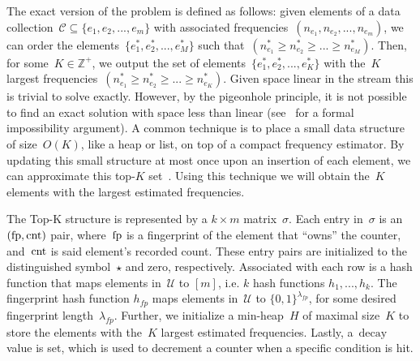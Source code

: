 The exact version of the problem is defined as follows: given elements of a data collection~$\mathcal{C} \subseteq  \{ e_1,e_2,...,e_m \}$ with associated frequencies~$(n_{e_1},n_{e_2},...,n_{e_m})$, we can order the elements~$\{ e^{*}_{1},e^{*}_{2},...,e^{*}_{M} \}$ such that~$(n^{*}_{e_1} \geq n^{*}_{e_2} \geq ... \geq n^{*}_{e_M})$. Then, for some~$K \in \mathbb{Z}^{+}$, we output the set of elements~$\{ e^{*}_{1},e^{*}_{2},...,e^{*}_{K} \}$ with the~$K$ largest frequencies~$(n^{*}_{e_1} \geq n^{*}_{e_2} \geq ... \geq n^{*}_{e_K})$. Given space linear in the stream this is trivial to solve exactly. However, by the pigeonhole principle, it is not possible to find an exact solution with space less than linear (see~\cite{Roughgarden_Valiant} for a formal impossibility argument).
A common technique is to place a small data structure of size~$O(K)$, like a heap or list, on top of a compact frequency estimator. By updating this small structure at most once upon an insertion of each element, we can approximate this top-$K$ set~\cite{mandal2018topkapi,metwally2006}. Using this technique we will obtain the~$K$ elements with the largest estimated frequencies. 

The Top-K structure is represented by a $k{ \times} m$ matrix~$\sigma$. Each entry in~$\sigma$ is an $(\textup{fp},\textup{cnt})$ pair, where~$\textup{fp}$ is a fingerprint of the element that ``owns'' the counter, and~$\textup{cnt}$ is said element's recorded count. These entry pairs are initialized to the distinguished symbol~$\star$ and zero, respectively. Associated with each row is a hash function that maps elements in~$\mathcal{U}$ to $[m]$, i.e. $k$ hash functions $h_1,...,h_k$. The fingerprint hash function $h_\mathit{fp}$ maps elements in~$\mathcal{U}$ to $\{ 0,1 \}^{\lambda_{\mathit{fp}}}$, for some desired fingerprint length~$\lambda_{\mathit{fp}}$. Further, we initialize a min-heap~$H$ of maximal size~$K$ to store the elements with the~$K$ largest estimated frequencies. Lastly, a~$\mathrm{decay}$ value is set, which is used to decrement a counter when a specific condition is hit. 


